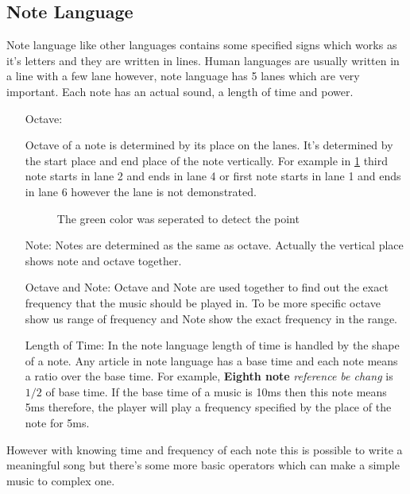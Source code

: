 \documentclass{report}
\begin{document}
\subsection{Note Language}
Note language like other languages contains some specified signs which works as it's letters and they are written in lines. Human languages are usually written in a line with a few lane however, note language has 5 lanes which are very important. Each note has an actual sound, a length of time and power. 
\begin{itemize}
\item[Octave: ]{Octave of a note is determined by its place on the lanes. It's determined by the start place and end place of the note vertically. For example in \ref{fig:notes} third note starts in lane 2 and ends in lane 4 or first note starts in lane 1 and ends in lane 6 however the lane is not demonstrated.

\begin{figure}
\caption{The green color was seperated to detect the point}
\label{fig:notes}
\end{figure}


}
\item[Note: ]{Notes are determined as the same as octave. Actually the vertical place shows note and octave together.}
\item[Octave and Note: ]{Octave and Note are used together to find out the exact frequency that the music should be played in. To be more specific octave show us range of frequency and Note show the exact frequency in the range.}
\item[Length of Time: ]{In the note language length of time is handled by the shape of a  note. Any article in note language has a base time and each note means a ratio over the base time. For example, \textbf{Eighth note} \textit{reference be chang} is $1/2$ of base time. If the base time of a music is 10ms then this note means 5ms therefore, the player will play a frequency specified by the place of the note for 5ms.}
\end{itemize}
However with knowing time and frequency of each note this is possible to write a meaningful song but there's some more basic operators which can make a simple music to complex one.
\end{document}
